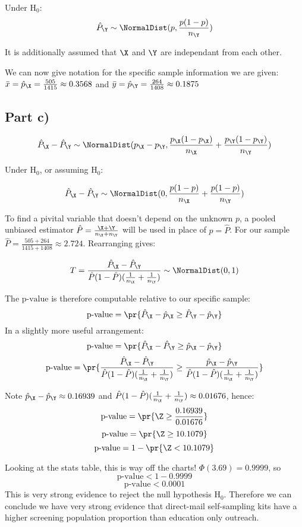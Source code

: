 Under $\text{H}_0$:
\[
\hat{P}_\Y \sim \NormalDist (p, \frac{p (1 - p)}{n_\Y})
\]

It is additionally assumed that $\X$ and $\Y$ are independant from each other.

We can now give notation for the specific sample information we are given:
$\bar{x} = \hat{p}_\X = \frac{505}{1415} \approx 0.3568$ and $\bar{y} = \hat{p}_\Y = \frac{264}{1408} \approx 0.1875$

\subsection{Part c)}

\[
\hat{P}_\X - \hat{P}_\Y \sim \NormalDist (p_\X - p_\Y, \frac{p_\X(1-p_\X)}{n_\X} + \frac{p_\Y(1-p_\Y)}{n_\Y})
\]

Under $\text{H}_0$, or assuming $\text{H}_0$:

\[
\hat{P}_\X - \hat{P}_\Y \sim \NormalDist (0, \frac{p(1-p)}{n_\X} + \frac{p(1-p)}{n_\Y})
\]

To find a pivital variable that doesn't depend on the unknown $p$, a pooled unbiased estimator $\hat{P} = \frac{\X + \Y}{n_\X + n_\Y}$
will be used in place of $p = \hat{P}$. For our sample $\hat{P} = \frac{505 + 264}{1415 + 1408} \approx 2.724$. Rearranging gives:

\[
T = \frac{\hat{P}_\X - \hat{P}_\Y}{\hat{P}(1 - \hat{P})(\frac{1}{n_\X} + \frac{1}{n_\Y})} \sim \NormalDist(0, 1)
\]

The $\text{p-value}$ is therefore computable relative to our specific sample:
\[
\text{p-value} = \pr{\hat{P}_\X - \hat{p}_\X \geq \hat{P}_\Y - \hat{p}_\Y}
\]
In a slightly more useful arrangement:
\[
\text{p-value} = \pr{\hat{P}_\X - \hat{P}_\Y \geq \hat{p}_\X - \hat{p}_\Y}
\]
\[
\text{p-value} = \pr{
	\frac{\hat{P}_\X - \hat{P}_\Y}{\hat{P}(1 - \hat{P})(\frac{1}{n_\X} + \frac{1}{n_\Y})}
	\geq
	\frac{\hat{p}_\X - \hat{p}_\Y}{\hat{P}(1 - \hat{P})(\frac{1}{n_\X} + \frac{1}{n_\Y})}
}
\]

Note $\hat{p}_\X - \hat{p}_\Y \approx 0.16939$ and $\hat{P}(1 - \hat{P})(\frac{1}{n_\X} + \frac{1}{n_\Y}) \approx 0.01676$, hence:
\[
\text{p-value} = \pr{ \Z \geq \frac{0.16939}{0.01676}}
\]
\[
\text{p-value} = \pr{ \Z \geq 10.1079}
\]
\[
\text{p-value} = 1 - \pr{ \Z < 10.1079}
\]

Looking at the stats table, this is way off the charts! $\Phi(3.69) = 0.9999$, so
\[
\text{p-value} < 1 - 0.9999
\]
\[
\text{p-value} < 0.0001
\]
This is very strong evidence to reject the null hypothesis $\text{H}_0$.
Therefore we can conclude we have very strong evidence that direct-mail self-sampling kits have a higher screening population proportion than
education only outreach.
